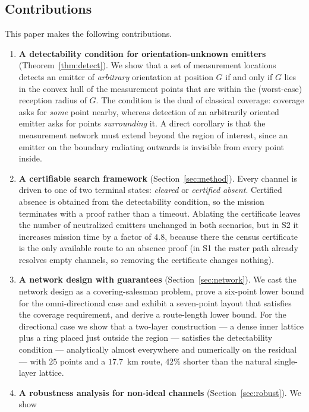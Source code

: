 \documentclass[journal,10pt]{IEEEtran}
\theoremstyle{definition}
\begin{document}
\subsection{Contributions}

This paper makes the following contributions.

\begin{enumerate}
\item \textbf{A detectability condition for orientation-unknown emitters}
(Theorem~\ref{thm:detect}). We show that a set of measurement locations detects an emitter of
\emph{arbitrary} orientation at position $G$ if and only if $G$ lies in the convex hull of the
measurement points that are within the (worst-case) reception radius of $G$. The condition is
the dual of classical coverage: coverage asks for \emph{some} point nearby, whereas detection of
an arbitrarily oriented emitter asks for points \emph{surrounding} it. A direct corollary is that
the measurement network must extend beyond the region of interest, since an emitter on the
boundary radiating outwards is invisible from every point inside.
\item \textbf{A certifiable search framework} (Section~\ref{sec:method}). Every channel is driven
to one of two terminal states: \emph{cleared} or \emph{certified absent}. Certified absence is
obtained from the detectability condition, so the mission terminates with a proof rather than a
timeout. Ablating the certificate leaves the number of neutralized emitters unchanged in both
scenarios, but in S2 it increases mission time by a factor of $4.8$, because there the census
certificate is the only available route to an absence proof (in S1 the raster path already resolves
empty channels, so removing the certificate changes nothing).
\item \textbf{A network design with guarantees} (Section~\ref{sec:network}). We cast the network
design as a covering-salesman problem, prove a six-point lower bound for the omni-directional case
and exhibit a seven-point layout that satisfies the coverage requirement, and derive a route-length
lower bound. For the directional case we show that a two-layer construction --- a dense inner
lattice plus a ring placed just outside the region --- satisfies the detectability condition --- analytically almost everywhere and numerically on the residual --- with $25$ points and a $17.7$~km route, $42\%$ shorter than the natural single-layer lattice.
\item \textbf{A robustness analysis for non-ideal channels} (Section~\ref{sec:robust}). We show

\end{enumerate}
\end{document}

